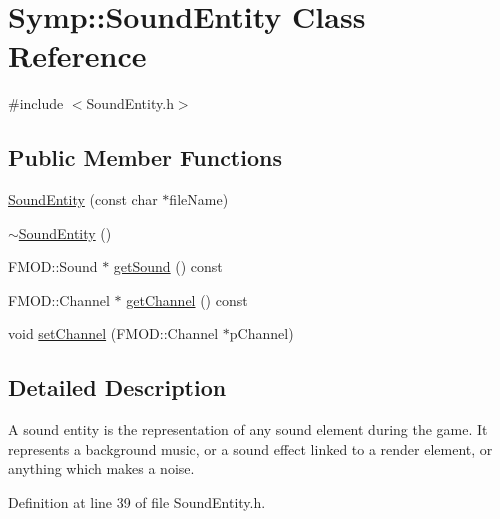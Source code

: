 \hypertarget{class_symp_1_1_sound_entity}{\section{Symp\-:\-:Sound\-Entity Class Reference}
\label{class_symp_1_1_sound_entity}
}


{\ttfamily \#include $<$Sound\-Entity.\-h$>$}

\subsection*{Public Member Functions}
\begin{DoxyCompactItemize}
\item 
\hyperlink{class_symp_1_1_sound_entity_ae96bbc7bfe94c4759111904ba84882c3}{Sound\-Entity} (const char $\ast$file\-Name)
\item 
\hyperlink{class_symp_1_1_sound_entity_a90e4f841f08e1d74b7fe6e7697c75fee}{$\sim$\-Sound\-Entity} ()
\item 
F\-M\-O\-D\-::\-Sound $\ast$ \hyperlink{class_symp_1_1_sound_entity_a61a5a9145c3a9a7a42d891de4667aca1}{get\-Sound} () const 
\item 
F\-M\-O\-D\-::\-Channel $\ast$ \hyperlink{class_symp_1_1_sound_entity_a1e737f226f11f3c2afd67011c19c1c0f}{get\-Channel} () const 
\item 
void \hyperlink{class_symp_1_1_sound_entity_a4cccf6833eef1dbae8b2afae193cdb19}{set\-Channel} (F\-M\-O\-D\-::\-Channel $\ast$p\-Channel)
\end{DoxyCompactItemize}


\subsection{Detailed Description}
A sound entity is the representation of any sound element during the game. It represents a background music, or a sound effect linked to a render element, or anything which makes a noise. 

Definition at line 39 of file Sound\-Entity.\-h.



